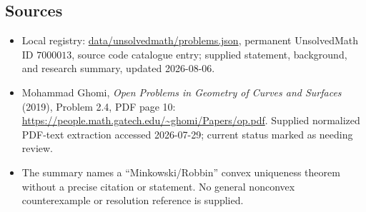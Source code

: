 \documentclass[11pt]{article}
\begin{document}
\subsection{Sources}
\begin{itemize}
\item Local registry: \url{data/unsolvedmath/problems.json}, permanent UnsolvedMath ID \(7000013\), source code catalogue entry; supplied statement, background, and research summary, updated 2026-08-06.
\item Mohammad Ghomi, \emph{Open Problems in Geometry of Curves and Surfaces} (2019), Problem 2.4, PDF page 10: \url{https://people.math.gatech.edu/~ghomi/Papers/op.pdf}. Supplied normalized PDF-text extraction accessed 2026-07-29; current status marked as needing review.
\item The summary names a ``Minkowski/Robbin'' convex uniqueness theorem without a precise citation or statement. No general nonconvex counterexample or resolution reference is supplied.
\end{itemize}
\end{document}
